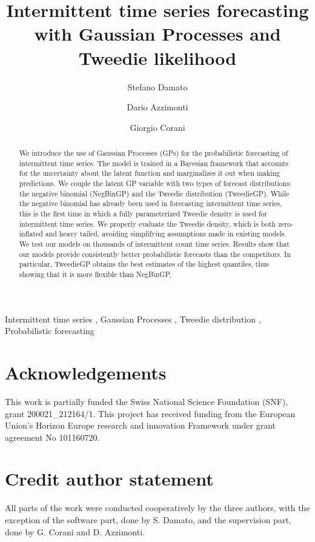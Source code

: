 \documentclass[preprint, authoryear]{elsarticle}
\begin{document}
\begin{frontmatter}
\title{Intermittent time series forecasting with Gaussian Processes and Tweedie likelihood}

\author[1]{Stefano Damato}

\author[1]{Dario Azzimonti}

\author[1]{Giorgio Corani}



\begin{abstract}
We introduce the use of Gaussian Processes (GPs) for the probabilistic forecasting of intermittent time series. 
The model is trained in a Bayesian framework that accounts for the uncertainty about the latent function and marginalizes it out when  making predictions.  
We couple the latent GP variable with two types of forecast distributions: the negative binomial (NegBinGP) and the Tweedie distribution (TweedieGP). While the negative binomial has already been used in forecasting intermittent time series, this is the first time in which a fully parameterized Tweedie density is used for intermittent time series. We properly evaluate the Tweedie density, which is both zero-inflated and heavy tailed, avoiding  simplifying assumptions made in existing models. 
We test our models on thousands of intermittent count time series. Results show that our models provide consistently better probabilistic forecasts than the competitors. 
In particular, TweedieGP obtains the best estimates of the highest quantiles, thus showing that it is more flexible than NegBinGP.
\end{abstract}

\begin{keyword}
Intermittent time series \sep
Gaussian Processes \sep
Tweedie distribution \sep
Probabilistic forecasting
\end{keyword}
\end{frontmatter}

\section*{Acknowledgements}
This work is partially funded the Swiss National Science Foundation (SNF), grant 200021\_212164/1.
This project has received funding from the European Union’s Horizon Europe research and innovation Framework under grant agreement No 101160720.

\section*{Credit author statement}
All parts of the work were conducted cooperatively by the three authors, with the exception of the software part, done by S. Damato, and the supervision part, done by G. Corani and D. Azzimonti.
\end{document}
